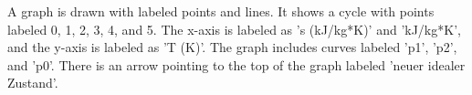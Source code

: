 A graph is drawn with labeled points and lines. It shows a cycle with points labeled 0, 1, 2, 3, 4, and 5. The x-axis is labeled as 's (kJ/kg*K)' and 'kJ/kg*K', and the y-axis is labeled as 'T (K)'. The graph includes curves labeled 'p1', 'p2', and 'p0'. There is an arrow pointing to the top of the graph labeled 'neuer idealer Zustand'.